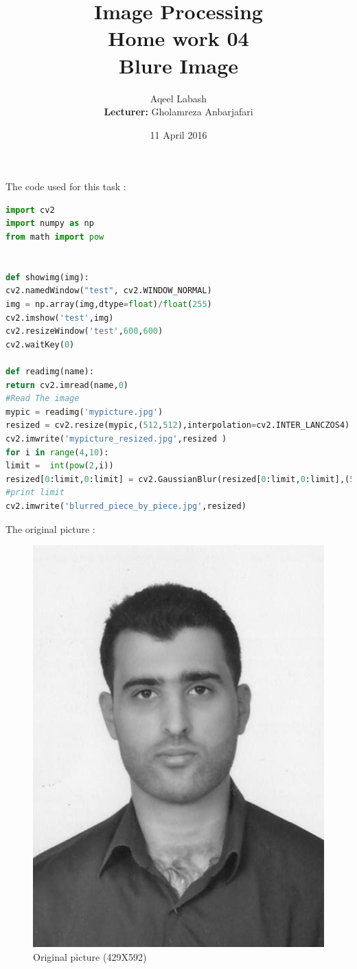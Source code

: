 \documentclass{article}
\title{Image Processing\\
	Home work 04\\Blure Image  }
\author{Aqeel Labash\\ \textbf{Lecturer:} Gholamreza Anbarjafari}
\date{11 April 2016}
\begin{document}
	\maketitle
The code used for this task :
	\begin{lstlisting}[language=Python]
import cv2
import numpy as np
from math import pow


def showimg(img):
cv2.namedWindow("test", cv2.WINDOW_NORMAL)
img = np.array(img,dtype=float)/float(255)
cv2.imshow('test',img)
cv2.resizeWindow('test',600,600)
cv2.waitKey(0)

def readimg(name):
return cv2.imread(name,0)
#Read The image
mypic = readimg('mypicture.jpg')
resized = cv2.resize(mypic,(512,512),interpolation=cv2.INTER_LANCZOS4)
cv2.imwrite('mypicture_resized.jpg',resized )
for i in range(4,10):
limit =  int(pow(2,i))
resized[0:limit,0:limit] = cv2.GaussianBlur(resized[0:limit,0:limit],(5,5),20)
#print limit
cv2.imwrite('blurred_piece_by_piece.jpg',resized)
	\end{lstlisting}
The original picture :
\begin{figure}[H]
	\begin{center}
\includegraphics[scale=1]{mypicture.jpg}
\caption{Original picture (429X592)}
	\end{center}
\end{figure}
\end{document}

